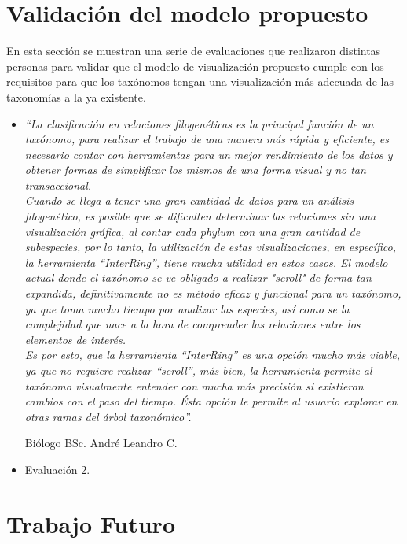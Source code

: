 \documentclass[journal]{IEEEtran}
\begin{document}
\section{Validación del modelo propuesto}
En esta sección se muestran una serie de evaluaciones que realizaron distintas personas para validar que el modelo de 
visualización propuesto cumple con los requisitos para que los taxónomos 
tengan una visualización más adecuada de las taxonomías a la ya existente.
\newline
\begin{itemize}
  \item \textit{“La clasificación en relaciones filogenéticas es la principal función de un taxónomo, para realizar el trabajo de una manera más rápida y eficiente, es necesario contar con herramientas para un mejor rendimiento de los datos y obtener formas de simplificar los mismos de una forma visual y no tan transaccional. \\
  Cuando se llega a tener una gran cantidad de datos para un análisis filogenético, es posible que se dificulten determinar las relaciones sin una visualización gráfica, al contar cada phylum con una gran cantidad de subespecies, por lo tanto, la utilización de estas visualizaciones, en específico, la herramienta “InterRing”, tiene mucha utilidad en estos casos. El modelo actual donde el taxónomo se ve obligado a realizar "scroll" de forma tan expandida, definitivamente no es método eficaz y funcional para un taxónomo, ya que toma mucho tiempo por analizar las especies, así como se la complejidad que nace a la hora de comprender las relaciones entre los elementos de interés. \\
  Es por esto, que la herramienta “InterRing” es una opción mucho más viable, ya que no requiere realizar “scroll”, más bien, la herramienta permite al taxónomo visualmente entender con mucha más precisión si existieron cambios con el paso del tiempo. Ésta opción le permite al usuario explorar en otras ramas del árbol taxonómico”.}
  
Biólogo BSc. André Leandro C. \\

  \item Evaluación 2.\\
\end{itemize}

\section{Trabajo Futuro}
\end{document}
